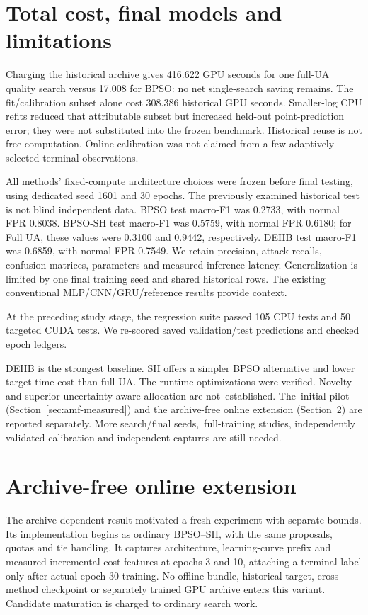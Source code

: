 \section{Total cost, final models and limitations}
Charging the historical archive gives 416.622 GPU seconds for one full-UA quality search versus 17.008 for BPSO: no net single-search saving remains. The fit/calibration subset alone cost 308.386 historical GPU seconds. Smaller-log CPU refits reduced that attributable subset but increased held-out point-prediction error; they were not substituted into the frozen benchmark. Historical reuse is not free computation. Online calibration was not claimed from a few adaptively selected terminal observations.

All methods' fixed-compute architecture choices were frozen before final testing, using dedicated seed 1601 and 30 epochs. The previously examined historical test is not blind independent data. BPSO test macro-F1 was 0.2733, with normal FPR 0.8038. BPSO-SH test macro-F1 was 0.5759, with normal FPR 0.6180; for Full UA, these values were 0.3100 and 0.9442, respectively. DEHB test macro-F1 was 0.6859, with normal FPR 0.7549. We retain precision, attack recalls, confusion matrices, parameters and measured inference latency. Generalization is limited by one final training seed and shared historical rows. The existing conventional MLP/CNN/GRU/reference results provide context.

At the preceding study stage, the regression suite passed 105 CPU tests and 50 targeted CUDA tests. We re-scored saved validation/test predictions and checked epoch ledgers.

DEHB is the strongest baseline. SH offers a simpler BPSO alternative and lower target-time cost than full UA. The runtime optimizations were verified. Novelty and superior uncertainty-aware allocation are \mbox{not established.} The~initial pilot (Section~\ref{sec:amf-measured}) and the archive-free online extension (Section~\ref{sec:amf-online}) are reported separately. More search/final \mbox{seeds, full-training} studies, independently validated calibration and independent captures are still needed.

\section{Archive-free online extension}
\label{sec:amf-online}
The archive-dependent result motivated a fresh experiment with separate bounds. Its implementation begins as ordinary BPSO--SH, with the same proposals, quotas and tie handling. It captures architecture, learning-curve prefix and measured incremental-cost features at epochs 3 and 10, attaching a terminal label only after actual epoch 30 training. No offline bundle, historical target, cross-method checkpoint or separately trained GPU archive enters this variant. Candidate maturation is charged to ordinary search work.

